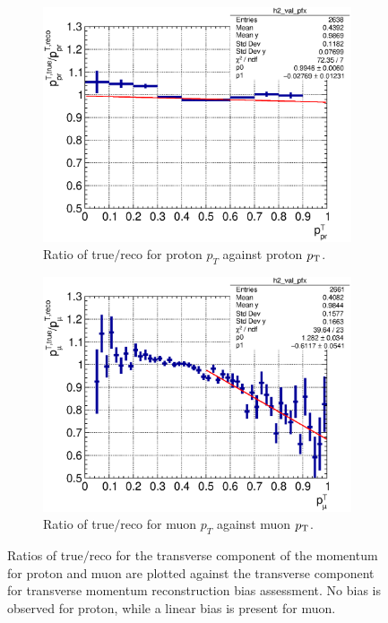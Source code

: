      \begin{figure}[ht]
     \centering
     \begin{subfigure}{\dbfigwid\textwidth}
          \centering
          \includegraphics[width=\textwidth]{figures/sel/pr_pt_vs_pr_pt_bias_hist2d_al14.eps}
          \caption{Ratio of true$/$reco for proton $p_T$ against proton $p_\textrm{T}$.}
          \label{subfig:esc-prpt}
     \end{subfigure}
     \begin{subfigure}{\dbfigwid\textwidth}
          \centering
          \includegraphics[width=\textwidth]{figures/sel/mu_pt_vs_mu_pt_bias_hist2d_al14.eps}
          \caption{Ratio of true$/$reco for muon $p_T$ against muon $p_\textrm{T}$.}
          \label{subfig:esc-mupt}
     \end{subfigure}
     \caption{Ratios of true$/$reco for the transverse component of the momentum for proton and muon are plotted against the transverse component for transverse momentum reconstruction bias assessment. No bias is observed for proton, while a linear bias is present for muon.}
     \label{fig:esc-prmupt}
     \end{figure}

